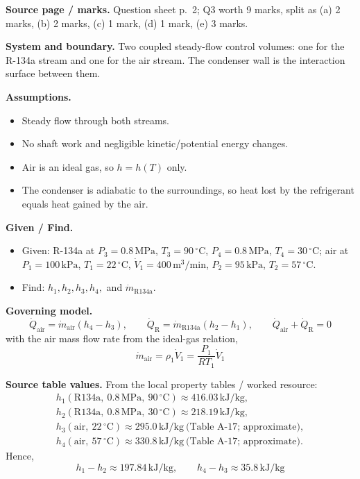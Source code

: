 \textbf{Source page / marks.} Question sheet p.~2; Q3 worth 9 marks, split as (a) 2 marks, (b) 2 marks, (c) 1 mark, (d) 1 mark, (e) 3 marks.

\textbf{System and boundary.} Two coupled steady-flow control volumes: one for the R-134a stream and one for the air stream. The condenser wall is the interaction surface between them.

\textbf{Assumptions.}
\begin{itemize}
  \item Steady flow through both streams.
  \item No shaft work and negligible kinetic/potential energy changes.
  \item Air is an ideal gas, so $h=h(T)$ only.
  \item The condenser is adiabatic to the surroundings, so heat lost by the refrigerant equals heat gained by the air.
\end{itemize}

\textbf{Given / Find.}
\begin{itemize}
  \item Given: R-134a at $P_3=0.8\,\mathrm{MPa}$, $T_3=90\,^\circ\mathrm{C}$, $P_4=0.8\,\mathrm{MPa}$, $T_4=30\,^\circ\mathrm{C}$; air at $P_1=100\,\mathrm{kPa}$, $T_1=22\,^\circ\mathrm{C}$, $\dot V_1=400\,\mathrm{m^3/min}$, $P_2=95\,\mathrm{kPa}$, $T_2=57\,^\circ\mathrm{C}$.
  \item Find: $h_1, h_2, h_3, h_4,$ and $\dot m_{\mathrm{R134a}}$.
\end{itemize}

\textbf{Governing model.}
\[
\dot Q_{\mathrm{air}} = \dot m_{\mathrm{air}}(h_4-h_3),\qquad \dot Q_{\mathrm{R}} = \dot m_{\mathrm{R134a}}(h_2-h_1),\qquad \dot Q_{\mathrm{air}} + \dot Q_{\mathrm{R}} = 0
\]
with the air mass flow rate from the ideal-gas relation,
\[
\dot m_{\mathrm{air}} = \rho_1\dot V_1 = \frac{P_1}{RT_1}\dot V_1
\]

\textbf{Source table values.} From the local property tables / worked resource:
\[
\begin{array}{l}
 h_1(\text{R134a},\ 0.8\,\mathrm{MPa},\ 90\,^\circ\mathrm{C}) \approx 416.03\,\mathrm{kJ/kg},\\
 h_2(\text{R134a},\ 0.8\,\mathrm{MPa},\ 30\,^\circ\mathrm{C}) \approx 218.19\,\mathrm{kJ/kg},\\
 h_3(\text{air},\ 22\,^\circ\mathrm{C}) \approx 295.0\,\mathrm{kJ/kg}\ \text{(Table A-17; approximate)},\\
 h_4(\text{air},\ 57\,^\circ\mathrm{C}) \approx 330.8\,\mathrm{kJ/kg}\ \text{(Table A-17; approximate)}.
\end{array}
\]
Hence,
\[
 h_1-h_2 \approx 197.84\,\mathrm{kJ/kg},\qquad h_4-h_3 \approx 35.8\,\mathrm{kJ/kg}
\]

